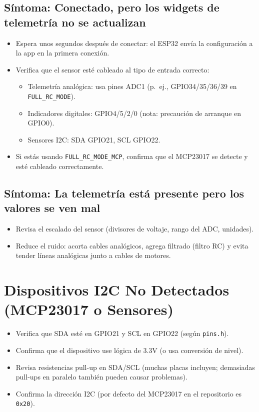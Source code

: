 \subsection*{Síntoma: Conectado, pero los widgets de telemetría no se actualizan}
\begin{itemize}
    \item Espera unos segundos después de conectar: el ESP32 envía la configuración a la app en la primera conexión.
    \item Verifica que el sensor esté cableado al tipo de entrada correcto:
    \begin{itemize}
        \item Telemetría analógica: usa pines ADC1 (p.\ ej., GPIO34/35/36/39 en \texttt{FULL\_RC\_MODE}).
        \item Indicadores digitales: GPIO4/5/2/0 (nota: precaución de arranque en GPIO0).
        \item Sensores I2C: SDA GPIO21, SCL GPIO22.
    \end{itemize}
    \item Si estás usando \texttt{FULL\_RC\_MODE\_MCP}, confirma que el MCP23017 se detecte y esté cableado correctamente.
\end{itemize}

\subsection*{Síntoma: La telemetría está presente pero los valores se ven mal}
\begin{itemize}
    \item Revisa el escalado del sensor (divisores de voltaje, rango del ADC, unidades).
    \item Reduce el ruido: acorta cables analógicos, agrega filtrado (filtro RC) y evita tender líneas analógicas junto a cables de motores.
\end{itemize}

\section{Dispositivos I2C No Detectados (MCP23017 o Sensores)}
\label{sec:i2c}

\begin{itemize}
    \item Verifica que SDA esté en GPIO21 y SCL en GPIO22 (según \texttt{pins.h}).
    \item Confirma que el dispositivo use lógica de 3.3V (o usa conversión de nivel).
    \item Revisa resistencias pull-up en SDA/SCL (muchas placas incluyen; demasiadas pull-ups en paralelo también pueden causar problemas).
    \item Confirma la dirección I2C (por defecto del MCP23017 en el repositorio es \texttt{0x20}).
\end{itemize}

